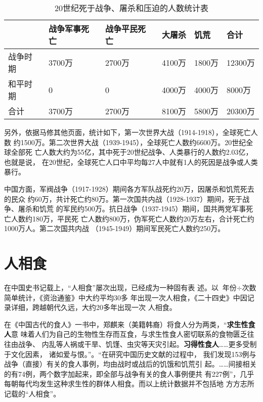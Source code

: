 \begin{table}[h] \centering
  \caption{20世纪死于战争、屠杀和压迫的人数统计表}
  \label{20stdied} \medskip
  \begin{tabular}{@{}llllll@{}}
    \toprule & 战争军事死亡 & 战争平民死亡 & 大屠杀 & 饥荒 & 合计 \\ \midrule
    战争时期 & 3700万 & 2700万 & 4100万 & 1800万 & 12300万 \\
    和平时期 & 0 & 0 & 4000万 & 4000万 & 8000万 \\
    合计 & 3700万 & 2700万 & 8100万 & 5800万 & 20300万 \\ \bottomrule
  \end{tabular}
\end{table}

另外，依据马修其他页面，统计如下，第一次世界大战（1914-1918），全球死亡人数
约1500万。第二次世界大战（1939-1945），全球死亡人数约6600万。20世纪全球全部死
亡人数大约为55亿，其中死于20世纪战争、人类暴行的人数约2.03亿，也就是说，
在20世纪，全球死亡人口中平均每27人中就有1人的死因是战争或人类暴行。

中国方面，军阀战争（1917-1928）期间各方军队战死约20万，因屠杀和饥荒死去的民众
约60万，共计死亡约80万。第一次国共内战（1928-1937）期间，死于战争、屠杀和饥荒
的军民约500万。抗日战争（1937-1945）期间，国共两党军事死亡人数约180万，平民死
亡人数约800万，伪军死亡人数约20万左右，合计死亡约1000万人。第二次国共内战
（1945-1949）期间军民死亡人数约250万。

\section{人相食}

在中国史书记载上，“人相食”屡次出现，已经成为一种固有表
述\cite{renxiangshi}。以 $ \mbox{年份} \div \mbox{次数} $ 简单统计，《资治通鉴》中大约平均30多
年出现一次人相食，《二十四史》中因记录详细，跨越朝代久远，大约20多年出现一次
人相食。

在《中国古代的食人》一书中，郑麒来（美籍韩裔）将食人分为两类，“\textbf{求生性食人}意
味着人们为自己的生物性生存而互食，与求生性食人密切联系的食物匮乏往往由战争、
内乱等人祸或干旱、饥馑、虫灾等天灾引起。\textbf{习得性食人}……更多受制于文化因素，
诸如爱与恨。”。“在研究中国历史文献的过程中，
我们发现153例与战争（直接）有关的食人事例，均由战时或战后的饥饿和饥荒引
起。……间接相关的有74例，两个数字加起来，即全部与战争有关的食人事例便共
有227例”，几乎每朝每代均发生这种求生性的群体人相食。而以上统计数据并不包括地
方方志所记载的“人相食”。

